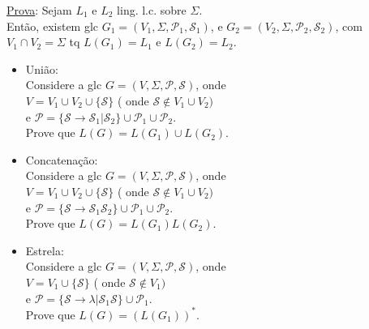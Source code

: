 \documentclass{article}
\begin{document}
    \underline{Prova}: Sejam $L_1$ e $L_2$ ling. l.c. sobre $\Sigma$. \\
        Então, existem glc $ G_1 = (V_1, \Sigma, \mathcal{P}_1, \mathcal{S}_1 ) $, e 
                            $ G_2 = (V_2, \Sigma, \mathcal{P}_2, \mathcal{S}_2 ) $, com $ V_1 \cap V_2 = \Sigma $
                            tq  $ L(G_1) = L_1 $ e $ L(G_2) = L_2 $.
    \begin{itemize}
        \item União: \\ 
                Considere a glc $ G = ( V, \Sigma, \mathcal{P}, \mathcal{S} ) $, onde \\
                $ V = V_1 \cup V_2 \cup \{\mathcal{S}\} $ ( onde $ \mathcal{S} \notin V_1 \cup V_2 ) $ \\
                e $ \mathcal{P} = \{ \mathcal{S} \rightarrow \mathcal{S}_1 | \mathcal{S}_2 \} \cup \mathcal{P}_1 \cup 
                                    \mathcal{P}_2 $.\\
                Prove que $ L(G) = L(G_1) \cup L(G_2) $.
        \item Concatenação: \\
                Considere a glc $ G = ( V, \Sigma, \mathcal{P}, \mathcal{S} ) $, onde \\
                $ V = V_1 \cup V_2 \cup \{\mathcal{S}\} $ ( onde $ \mathcal{S} \notin V_1 \cup V_2 ) $ \\
                e $ \mathcal{P} = \{ \mathcal{S} \rightarrow \mathcal{S}_1\mathcal{S}_2 \} \cup \mathcal{P}_1 \cup 
                                    \mathcal{P}_2 $. \\
                Prove que $ L(G) = L(G_1)L(G_2) $.
        \item Estrela: \\
                Considere a glc $ G = ( V, \Sigma, \mathcal{P}, \mathcal{S} ) $, onde \\
                $ V = V_1 \cup \{\mathcal{S}\} $ ( onde $ \mathcal{S} \notin V_1 ) $ \\
                e $ \mathcal{P} = \{ \mathcal{S} \rightarrow \lambda|\mathcal{S}_1\mathcal{S} \} \cup \mathcal{P}_1 $.\\
                Prove que $ L(G) = (L(G_1))^* $.
    \end{itemize}
\end{document}
